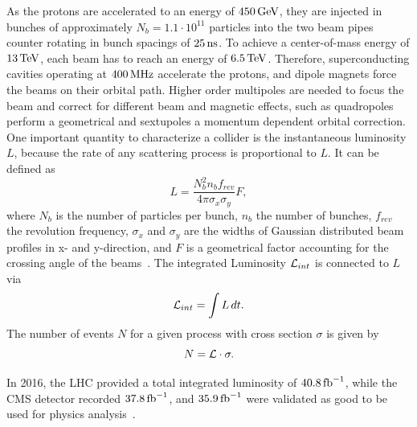 As the protons are accelerated to an energy of $450\,\text{Ge\hspace{-.08em}V}$, they are injected in bunches of approximately $N_b=1.1\cdot10^{11}$ particles into the two beam pipes counter rotating in bunch spacings of $25\,\text{ns}$. To achieve a center-of-mass energy of $13\,\text{Te\hspace{-.08em}V}$, each beam has to reach an energy of $6.5\,\text{Te\hspace{-.08em}V}$. Therefore, superconducting cavities operating at $400\,\text{MHz}$ accelerate the protons, and dipole magnets force the beams on their orbital path. Higher order multipoles are needed to focus the beam and correct for different beam and magnetic effects, such as quadropoles perform a geometrical and sextupoles a momentum dependent orbital correction. \\
One important quantity to characterize a collider is the instantaneous luminosity $L$, because the rate of any scattering process is proportional to $L$. It can be defined as
\begin{equation}
 L = \frac{N_{b}^2 n_{b} f_{rev}} {4\pi \sigma_{x} \sigma_{y}}F,
\end{equation}
where $N_b$ is the number of particles per bunch, $n_b$ the number of bunches, $f_{rev}$ the revolution frequency, $\sigma_{x}$ and $\sigma_{y}$ are the widths of Gaussian distributed beam profiles in x- and y-direction, and $F$ is a geometrical factor accounting for the crossing angle of the beams~\cite{LuminosityConcept}. The integrated Luminosity $\mathcal{L}_{int}$ is connected to $L$ via
\begin{equation}
 \mathcal{L}_{int}= \int L \,dt.
\end{equation}
The number of events $N$ for a given process with cross section $\sigma$ is given by
\begin{equation}
 N= \mathcal{L} \cdot \sigma.
\end{equation}

In 2016, the LHC provided a total integrated luminosity of $40.8\mbox{\ensuremath{\,\text{fb}^\text{$-$1}}}$, while the CMS detector recorded $37.8\mbox{\ensuremath{\,\text{fb}^\text{$-$1}}}$, and $35.9\mbox{\ensuremath{\,\text{fb}^\text{$-$1}}}$ were validated as good to be used for physics analysis~\cite{DataQuality}.





